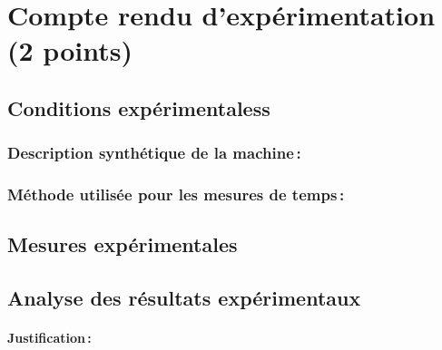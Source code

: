 \documentclass[a4paper, 10pt, french]{article}
\begin{document}
\section{Compte rendu d'expérimentation (2 points)}
  \subsection{Conditions expérimentaless}
  
    \subsubsection{Description synthétique de la machine\,:} 
      {
      
      } 

    \subsubsection{Méthode utilisée pour les mesures de temps\,: } 
      {
      
      }

  \subsection{Mesures expérimentales}
  
\subsection{Analyse des résultats expérimentaux}
\paragraph{Justification\,: }
{

 
}

\end{document}
